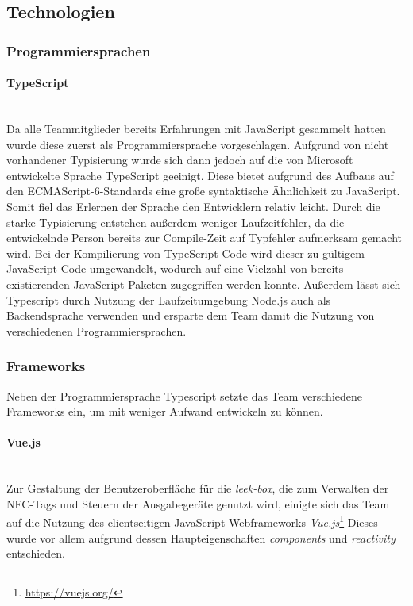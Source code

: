 \documentclass[10pt, a4paper]{article}
\begin{document}
\begin{onehalfspace}
  \subsection{Technologien}

  \label{technologien}

  \subsubsection{Programmiersprachen}

  \paragraph*{TypeScript} $~$ \\
  Da alle Teammitglieder bereits Erfahrungen mit JavaScript gesammelt hatten wurde diese zuerst als Programmiersprache vorgeschlagen.
  Aufgrund von nicht vorhandener Typisierung wurde sich dann jedoch auf die von Microsoft entwickelte Sprache TypeScript geeinigt. Diese bietet aufgrund des
  Aufbaus auf den ECMAScript-6-Standards eine große syntaktische Ähnlichkeit zu JavaScript. Somit fiel das Erlernen der Sprache den Entwicklern relativ leicht.
  Durch die starke Typisierung entstehen außerdem weniger Laufzeitfehler, da die entwickelnde Person bereits zur Compile-Zeit auf Typfehler aufmerksam gemacht wird.\cite{Typescript_Typisierung}
  Bei der Kompilierung von TypeScript-Code wird dieser zu gültigem JavaScript Code umgewandelt, wodurch auf eine Vielzahl von bereits existierenden JavaScript-Paketen zugegriffen werden konnte.
  Außerdem lässt sich Typescript durch Nutzung der Laufzeitumgebung Node.js auch als Backendsprache verwenden und ersparte dem Team damit die Nutzung von verschiedenen Programmiersprachen.


  \subsubsection{Frameworks}
  Neben der Programmiersprache Typescript setzte das Team verschiedene Frameworks ein, um mit weniger Aufwand entwickeln zu können.

  \paragraph*{Vue.js} $~$ \\
  Zur Gestaltung der Benutzeroberfläche für die \textit{leek-box}, die zum Verwalten der NFC-Tags und Steuern der Ausgabegeräte genutzt wird, einigte sich das Team auf die Nutzung des
  clientseitigen JavaScript-Webframeworks \textit{Vue.js}\footnote{\raggedright\url{https://vuejs.org/}}
  Dieses wurde vor allem aufgrund dessen Haupteigenschaften \textit{components} und \textit{reactivity} entschieden.


\end{onehalfspace}
\end{document}
